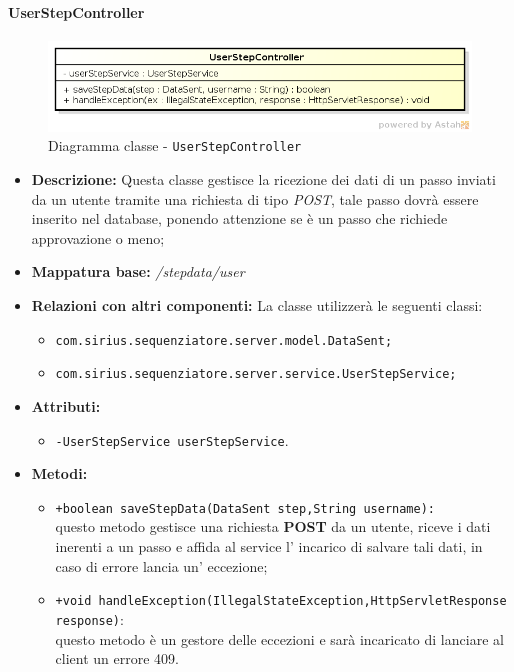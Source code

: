 \paragraph{UserStepController}%
\begin{figure}[H] \centering \includegraphics[width=%
\textwidth]
{./classi/server/userstepcontroller.png} \caption{Diagramma classe - \texttt{UserStepController}}
\end{figure}
\begin{itemize}
	\item \textbf{Descrizione: } Questa classe gestisce la ricezione dei dati di un passo inviati da un utente tramite una richiesta di tipo \textit{POST}, tale passo dovrà essere inserito nel database, ponendo attenzione se è un passo che richiede approvazione o meno;
	\item \textbf{Mappatura base: } \textit{\slash stepdata\slash user}
	\item \textbf{Relazioni con altri componenti: }
	La classe utilizzerà le seguenti classi:
	\begin{itemize}
		\item \texttt{com.sirius.sequenziatore.server.model.DataSent;}
		\item \texttt{com.sirius.sequenziatore.server.service.UserStepService;}
	\end{itemize}
	\item \textbf{Attributi: }\begin{itemize}
				\item \texttt{-UserStepService userStepService}.
	\end{itemize}
	\item \textbf{Metodi: }\begin{itemize}
					\item \texttt{+boolean saveStepData(DataSent step,String username):}\\
					questo metodo gestisce una richiesta \textbf{POST} da un utente, riceve i dati inerenti a un passo e affida al service l' incarico di salvare tali dati, in caso di errore lancia un' eccezione; 
					\item \texttt{+void handleException(IllegalStateException,HttpServletResponse response)}:\\
					 questo metodo è un gestore delle eccezioni e sarà incaricato di lanciare al client un errore 409.
				\end{itemize}
\end{itemize}
